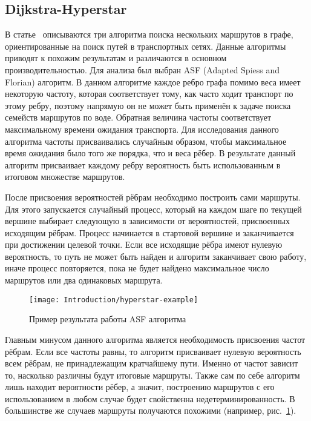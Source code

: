 \FloatBarrier

\subsection{Dijkstra-Hyperstar}

В статье~\cite{mafast} описываются три алгоритма поиска нескольких
маршрутов в графе, ориентированные на поиск путей в транспортных
сетях. Данные алгоритмы приводят к похожим результатам и различаются в
основном производительностью. Для анализа был выбран ASF (Adapted
Spiess and Florian) алгоритм. В данном алгоритме каждое ребро графа
помимо веса имеет некоторую частоту, которая соответствует тому, как
часто ходит транспорт по этому ребру, поэтому напрямую он не может
быть применён к задаче поиска семейств маршрутов по воде. Обратная
величина частоты соответствует максимальному времени ожидания
транспорта. Для исследования данного алгоритма частоты присваивались
случайным образом, чтобы максимальное время ожидания было того же
порядка, что и веса рёбер. В результате данный алгоритм присваивает
каждому ребру вероятность быть использованным в итоговом множестве
маршрутов.

После присвоения вероятностей рёбрам необходимо построить сами
маршруты. Для этого запускается случайный процесс, который на каждом
шаге по текущей вершине выбирает следующую в зависимости от
вероятностей, присвоенных исходящим рёбрам. Процесс начинается в
стартовой вершине и заканчивается при достижении целевой точки. Если
все исходящие рёбра имеют нулевую вероятность, то путь не может быть
найден и алгоритм заканчивает свою работу, иначе процесс повторяется,
пока не будет найдено максимальное число маршрутов или два одинаковых
маршрута.

\begin{figure}
    \texttt{[image: Introduction/hyperstar-example]}
    \caption{Пример результата работы ASF алгоритма}
    \label{fig:asf}
\end{figure}

Главным минусом данного алгоритма является необходимость присвоения
частот рёбрам. Если все частоты равны, то алгоритм присваивает нулевую
вероятность всем рёбрам, не принадлежащим кратчайшему пути. Именно от
частот зависит то, насколько различны будут итоговые маршруты. Также
сам по себе алгоритм лишь находит вероятности рёбер, а значит,
построению маршрутов с его использованием в любом случае будет
свойственна недетерминированность. В большинстве же случаев маршруты
получаются похожими (например, рис.~\ref{fig:asf}).


